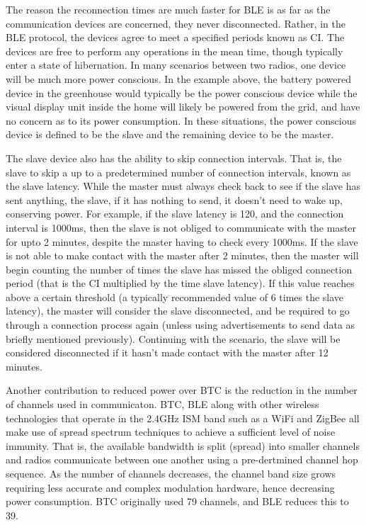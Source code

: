 \documentclass[]{article}
\begin{document}
The reason the reconnection times are much faster for \ac{BLE} is as far as the communication devices are concerned, they never disconnected. Rather, in the \ac{BLE} protocol, the devices agree to meet a specified periods known as \ac{CI}. The devices are free to perform any operations in the mean time, though typically enter a state of hibernation. In many scenarios between two radios, one device will be much more power conscious. In the example above, the battery powered device in the greenhouse would typically be the power conscious device while the visual display unit inside the home will likely be powered from the grid, and have no concern as to its power consumption. In these situations, the power conscious device is defined to be the slave and the remaining device to be the master. 

The slave device also has the ability to skip connection intervals. That is, the slave to skip a up to a predetermined number of connection intervals, known as the slave latency. While the master must always check back to see if the slave has sent anything, the slave, if it has nothing to send, it doesn't need to wake up, conserving power. For example, if the slave latency is 120, and the connection interval is 1000ms, then the slave is not obliged to communicate with the master for upto 2 minutes, despite the master having to check every 1000ms. If the slave is not able to make contact with the master after 2 minutes, then the master will begin counting the number of times the slave has missed the obliged connection period (that is the \ac{CI} multiplied by the time slave latency). If this value reaches above a certain threshold (a typically recommended value of 6 times the slave latency), the master will consider the slave disconnected, and be required to go through a connection process again (unless using advertisements to send data as briefly mentioned previously). Continuing with the scenario, the slave will be considered disconnected if it hasn't made contact with the master after 12 minutes.

Another contribution to reduced power over \ac{BTC} is the reduction in the number of channels used in communicaton. \ac{BTC}, \ac{BLE} along with other wireless technologies that operate in the 2.4GHz ISM band such as a WiFi and ZigBee all make use of spread spectrum techniques to achieve a sufficient level of noise immunity. That is, the available bandwidth is split (spread) into smaller channels and radios communicate between one another using a pre-dertmined channel hop sequence. As the number of channels decreases, the channel band size grows requiring less accurate and complex modulation hardware, hence decreasing power consumption. \ac{BTC} originally used 79 channels, and \ac{BLE} reduces this to 39.
\end{document}

